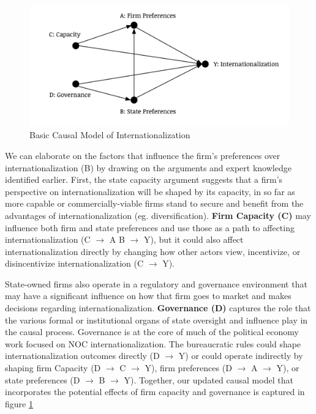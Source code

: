 \documentclass[11pt,]{book}
\begin{document}
\begin{figure}

{\centering \includegraphics[width=0.5\linewidth]{fig/basic_model_2} 

}

\caption{Basic Causal Model of Internationalization}\label{fig:basicmodel}
\end{figure}

We can elaborate on the factors that influence the firm's preferences over internationalization (B) by drawing on the arguments and expert knowledge identified earlier. First, the state capacity argument suggests that a firm's perspective on internationalization will be shaped by its capacity, in so far as more capable or commercially-viable firms stand to secure and benefit from the advantages of internationalization (eg. diversification). \textbf{Firm Capacity (C)} may influence both firm and state preferences and use those as a path to affecting internationalization (C \(\rightarrow\) A \textbar{} B \(\rightarrow\) Y), but it could also affect internationalization directly by changing how other actors view, incentivize, or disincentivize internationalization (C \(\rightarrow\) Y).

State-owned firms also operate in a regulatory and governance environment that may have a significant influence on how that firm goes to market and makes decisions regarding internationalization. \textbf{Governance (D)} captures the role that the various formal or institutional organs of state oversight and influence play in the causal process. Governance is at the core of much of the political economy work focused on NOC internationalization. The bureaucratic rules could shape internationalization outcomes directly (D \(\rightarrow\) Y) or could operate indirectly by shaping firm Capacity (D \(\rightarrow\) C \(\rightarrow\) Y), firm preferences (D \(\rightarrow\) A \(\rightarrow\) Y), or state preferences (D \(\rightarrow\) B \(\rightarrow\) Y). Together, our updated causal model that incorporates the potential effects of firm capacity and governance is captured in figure \ref{fig:basicmodel}
\end{document}
